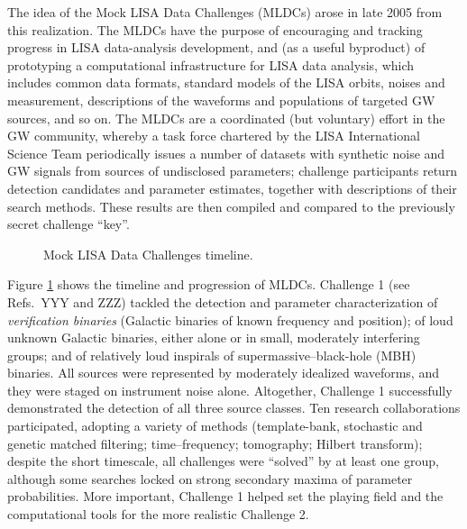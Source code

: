 \documentclass{iopart}
\begin{document}
The idea of the Mock LISA Data Challenges (MLDCs) arose in late 2005 from this realization. The MLDCs have the purpose of encouraging and tracking progress in LISA data-analysis development, and (as a useful byproduct) of prototyping a computational infrastructure for LISA data analysis, which includes common data formats, standard models of the LISA orbits, noises and measurement, descriptions of the waveforms and populations of targeted GW sources, and so on.
The MLDCs are a coordinated (but voluntary) effort in the GW community, whereby a task force chartered by the LISA International Science Team periodically issues a number of datasets with 
synthetic noise and GW signals from sources of undisclosed parameters; challenge participants return detection candidates and parameter estimates, together with descriptions of their search methods. These results are then compiled and compared to the previously secret challenge ``key''.
%
\begin{figure}
\caption{Mock LISA Data Challenges timeline.\label{fig:timeline}}
\end{figure}

Figure \ref{fig:timeline} shows the timeline and progression of MLDCs. Challenge 1 (see Refs.\ YYY and ZZZ) tackled the detection and parameter characterization of \emph{verification binaries} (Galactic binaries of known frequency and position); of loud unknown Galactic binaries, either alone or in small, moderately interfering groups; and of relatively loud inspirals of supermassive--black-hole (MBH)  binaries. All sources were represented by moderately idealized waveforms, and they were staged on instrument noise alone. Altogether, Challenge 1 successfully demonstrated the detection of all three source classes. Ten research collaborations participated, adopting a variety of methods (template-bank, stochastic and genetic matched filtering; time--frequency; tomography; Hilbert transform); despite the short timescale, all challenges were ``solved'' by at least one group, although some searches locked on strong secondary maxima of parameter probabilities. More important, Challenge 1 helped set the playing field and the computational tools for the more realistic Challenge 2.
\end{document}
